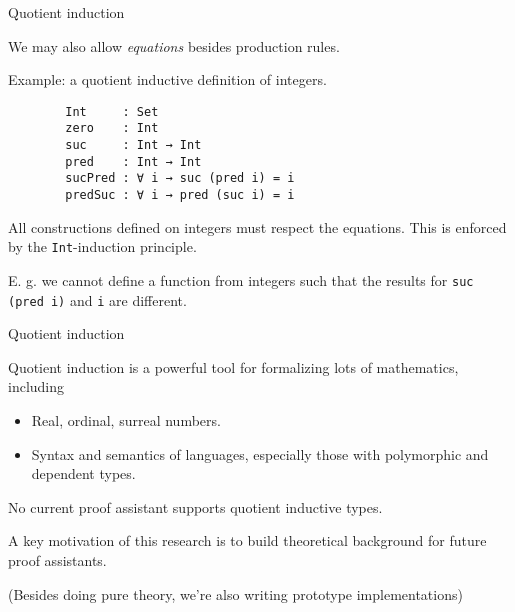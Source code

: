 \documentclass[dvipsnames]{beamer}
\begin{document}
\begin{frame}[fragile]{Quotient induction}

We may also allow \emph{equations} besides production rules.
\vspace{1em}

Example: a quotient inductive definition of integers.

\begin{verbatim}
        Int     : Set
        zero    : Int
        suc     : Int → Int
        pred    : Int → Int
        sucPred : ∀ i → suc (pred i) = i
        predSuc : ∀ i → pred (suc i) = i
\end{verbatim}

All constructions defined on integers must respect the equations. This is enforced
by the \texttt{Int}-induction principle.
\vspace{1em}

E. g. we cannot define a function from integers such that the results
for \texttt{suc (pred i)} and \texttt{i} are different.

\end{frame}

\begin{frame}[fragile]{Quotient induction}

Quotient induction is a powerful tool for formalizing lots of mathematics, including
\vspace{1em}

\begin{itemize}
\item Real, ordinal, surreal numbers.
\item Syntax and semantics of languages, especially those with polymorphic and dependent types.


\end{itemize}

\pause
\vspace{1em}
No current proof assistant supports quotient inductive types.
\vspace{1em}

A key motivation of this research is to build theoretical background for future proof assistants.
\vspace{1em}

(Besides doing pure theory, we're also writing prototype implementations)


\end{frame}
\end{document}

